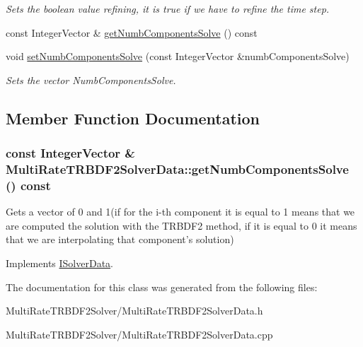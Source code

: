 \begin{DoxyCompactItemize}
\begin{DoxyCompactList}\small\item\em Sets the boolean value refining, it is true if we have to refine the time step. \item\end{DoxyCompactList}\item 
const IntegerVector \& \hyperlink{classMultiRateTRBDF2SolverData_ad8c376746e1daddc1f3ecc6986206c79}{getNumbComponentsSolve} () const 
\item 
\hypertarget{classMultiRateTRBDF2SolverData_a756db2ce93a3dfd2d24f0eb524d7e87b}{
void \hyperlink{classMultiRateTRBDF2SolverData_a756db2ce93a3dfd2d24f0eb524d7e87b}{setNumbComponentsSolve} (const IntegerVector \&numbComponentsSolve)}
\label{classMultiRateTRBDF2SolverData_a756db2ce93a3dfd2d24f0eb524d7e87b}

\begin{DoxyCompactList}\small\item\em Sets the vector NumbComponentsSolve. \item\end{DoxyCompactList}\end{DoxyCompactItemize}


\subsection{Member Function Documentation}
\hypertarget{classMultiRateTRBDF2SolverData_ad8c376746e1daddc1f3ecc6986206c79}{
\subsubsection[{getNumbComponentsSolve}]{\setlength{\rightskip}{0pt plus 5cm}const IntegerVector \& MultiRateTRBDF2SolverData::getNumbComponentsSolve () const}}
\label{classMultiRateTRBDF2SolverData_ad8c376746e1daddc1f3ecc6986206c79}
Gets a vector of 0 and 1(if for the i-\/th component it is equal to 1 means that we are computed the solution with the TRBDF2 method, if it is equal to 0 it means that we are interpolating that component's solution) 

Implements \hyperlink{classISolverData}{ISolverData}.

The documentation for this class was generated from the following files:\begin{DoxyCompactItemize}
\item 
MultiRateTRBDF2Solver/MultiRateTRBDF2SolverData.h\item 
MultiRateTRBDF2Solver/MultiRateTRBDF2SolverData.cpp\end{DoxyCompactItemize}
